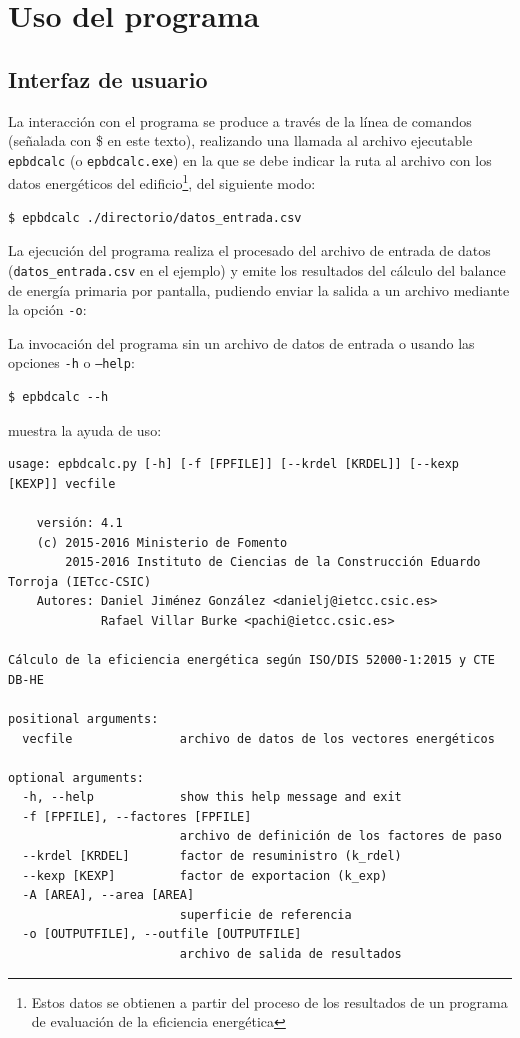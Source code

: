 \documentclass[10pt,notitlepage,oneside,a4paper]{article}
\begin{document}
\section{Uso del programa}
\label{sec:usoprograma}

\subsection{Interfaz de usuario}

La interacción con el programa se produce a través de la línea de comandos (señalada con \$ en este texto), realizando una llamada al archivo ejecutable \texttt{epbdcalc} (o \texttt{epbdcalc.exe}) en la que se debe indicar la ruta al archivo con los datos energéticos del edificio\footnote{Estos datos se obtienen a partir del proceso de los resultados de un programa de evaluación de la eficiencia energética}, del siguiente modo:

\begin{Verbatim}[fontsize=\small]
	$ epbdcalc ./directorio/datos_entrada.csv
\end{Verbatim}

La ejecución del programa realiza el procesado del archivo de entrada de datos (\texttt{datos\_entrada.csv} en el ejemplo) y emite los resultados  del cálculo del balance de energía primaria por pantalla, pudiendo enviar la salida a un archivo mediante la opción \texttt{-o}:


La invocación del programa sin un archivo de datos de entrada o usando las opciones \texttt{-h} o \texttt{--help}:

\begin{Verbatim}[fontsize=\small]
	$ epbdcalc --h
\end{Verbatim}

 muestra la ayuda de uso:

\begin{Verbatim}[fontsize=\small]
usage: epbdcalc.py [-h] [-f [FPFILE]] [--krdel [KRDEL]] [--kexp [KEXP]] vecfile

	versión: 4.1
	(c) 2015-2016 Ministerio de Fomento
	    2015-2016 Instituto de Ciencias de la Construcción Eduardo Torroja (IETcc-CSIC)
	Autores: Daniel Jiménez González <danielj@ietcc.csic.es>
	         Rafael Villar Burke <pachi@ietcc.csic.es>

Cálculo de la eficiencia energética según ISO/DIS 52000-1:2015 y CTE DB-HE

positional arguments:
  vecfile               archivo de datos de los vectores energéticos

optional arguments:
  -h, --help            show this help message and exit
  -f [FPFILE], --factores [FPFILE]
                        archivo de definición de los factores de paso
  --krdel [KRDEL]       factor de resuministro (k_rdel)
  --kexp [KEXP]         factor de exportacion (k_exp)
  -A [AREA], --area [AREA]
                        superficie de referencia
  -o [OUTPUTFILE], --outfile [OUTPUTFILE]
                        archivo de salida de resultados
\end{Verbatim}
\end{document}
